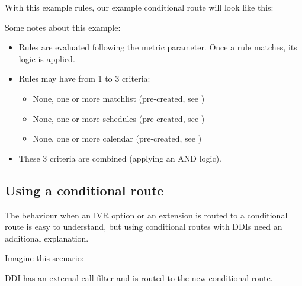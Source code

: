 \documentclass[letterpaper,10pt,english]{sphinxmanual}
\begin{document}
\noindent{}

With this example rules, our example conditional route will look like this:

\noindent{}

Some notes about this example:
\begin{itemize}
\item {} 
Rules are evaluated following the metric parameter. Once a rule matches, its
logic is applied.

\item {} 
Rules may have from 1 to 3 criteria:
\begin{itemize}
\item {} 
None, one or more matchlist (pre-created, see {\hyperref[pbx_features/match_lists:match\string-lists]{}})

\item {} 
None, one or more schedules (pre-created, see {\hyperref[pbx_features/external_filters:schedules]{}})

\item {} 
None, one or more calendar (pre-created, see {\hyperref[pbx_features/external_filters:calendars]{}})

\end{itemize}

\item {} 
These 3 criteria are combined (applying an AND logic).

\end{itemize}


\subsection{Using a conditional route}
\label{pbx_features/conditional_routes:using-a-conditional-route}
The behaviour when an IVR option or an extension is routed to a conditional
route is easy to understand, but using conditional routes with DDIs need an
additional explanation.

Imagine this scenario:

\noindent{}

DDI has an external call filter and is routed to the new conditional route.
\end{document}
